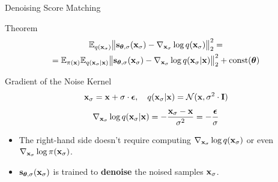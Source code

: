 \documentclass{beamer}
\begin{document}
\begin{frame}{Denoising Score Matching}
	\begin{block}{Theorem}
		\vspace{-0.5cm}
		\begin{multline*}
			\mathbb{E}_{q(\mathbf{x}_{\sigma})}\big\| \mathbf{s}_{\boldsymbol{\theta}, \sigma}(\mathbf{x}_{\sigma}) - \nabla_{\mathbf{x}_{\sigma}} \log q(\mathbf{x}_{\sigma}) \big\|^2_2 = \\
		= \mathbb{E}_{\pi(\mathbf{x})} \mathbb{E}_{q(\mathbf{x}_{\sigma} | \mathbf{x})}\big\| \mathbf{s}_{\boldsymbol{\theta}, \sigma}(\mathbf{x}_{\sigma}) - \nabla_{\mathbf{x}_{\sigma}} \log q(\mathbf{x}_{\sigma} | \mathbf{x}) \big\|^2_2 + \text{const}(\boldsymbol{\theta})
		\end{multline*}
		\vspace{-0.5cm}
	\end{block}
	\eqpause
	\begin{block}{Gradient of the Noise Kernel}
		\vspace{-0.3cm}
		\[
			\mathbf{x}_{\sigma} = \mathbf{x} + \sigma \cdot \boldsymbol{\epsilon}, \quad q(\mathbf{x}_{\sigma} | \mathbf{x}) = \mathcal{N}(\mathbf{x}, \sigma^2 \cdot \mathbf{I})
		\]
		\eqpause
		\vspace{-0.3cm}
		\[
			\nabla_{\mathbf{x}_{\sigma}} \log q(\mathbf{x}_{\sigma} | \mathbf{x}) = - \frac{\mathbf{x}_{\sigma} - \mathbf{x}}{\sigma^2}  = - \frac{\boldsymbol{\epsilon}}{\sigma}
		\]
		\eqpause
		\vspace{-0.5cm}
	\end{block}
	\begin{itemize}
		\item The right-hand side doesn't require computing $\nabla_{\mathbf{x}_{\sigma}} \log q(\mathbf{x}_{\sigma})$ or even $\nabla_{\mathbf{x}_{\sigma}} \log \pi(\mathbf{x}_{\sigma})$.
		\item $\mathbf{s}_{\boldsymbol{\theta}, \sigma}(\mathbf{x}_{\sigma})$ is trained to \textbf{denoise} the noised samples $\mathbf{x}_{\sigma}$.
	\end{itemize}
\end{frame}
\end{document}
